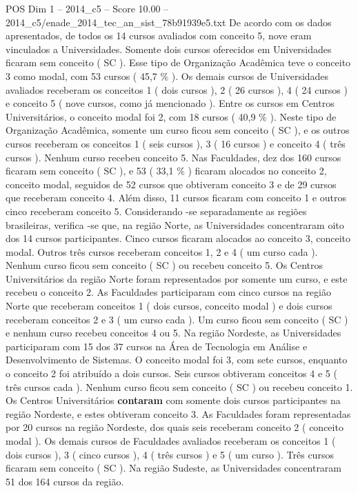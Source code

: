 \begin{textsample}{POS Dim 1 – 2014\_c5 – Score 10.00 – 2014\_c5/enade\_2014\_tec\_an\_sist\_78b91939e5.txt}
De acordo com os dados apresentados, de todos os 14 cursos avaliados com conceito 5, nove eram vinculados a Universidades.
Somente dois cursos oferecidos em Universidades ficaram sem conceito ( SC ).
Esse tipo de Organização Acadêmica teve o conceito 3 como modal, com 53 cursos ( 45,7 \% ).
Os demais cursos de Universidades avaliados receberam os conceitos 1 ( dois cursos ), 2 ( 26 cursos ), 4 ( 24 cursos ) e conceito 5 ( nove cursos, como já mencionado ).
Entre os cursos em Centros Universitários, o conceito modal foi 2, com 18 cursos ( 40,9 \% ).
Neste tipo de Organização Acadêmica, somente um curso ficou sem conceito ( SC ), e os outros cursos receberam os conceitos 1 ( seis cursos ), 3 ( 16 cursos ) e conceito 4 ( três cursos ).
Nenhum curso recebeu conceito 5.
Nas Faculdades, dez dos 160 cursos ficaram sem conceito ( SC ), e 53 ( 33,1 \% ) ficaram alocados no conceito 2, conceito modal, seguidos de 52 cursos que obtiveram conceito 3 e de 29 cursos que receberam conceito 4.
Além disso, 11 cursos ficaram com conceito 1 e outros cinco receberam conceito 5.
Considerando -se separadamente as regiões brasileiras, verifica -se que, na região Norte, as Universidades concentraram oito dos 14 cursos participantes.
Cinco cursos ficaram alocados ao conceito 3, conceito modal.
Outros três cursos receberam conceitos 1, 2 e 4 ( um curso cada ).
Nenhum curso ficou sem conceito ( SC ) ou recebeu conceito 5.
Os Centros Universitários da região Norte foram representados por somente um curso, e este recebeu o conceito 2.
As Faculdades participaram com cinco cursos na região Norte que receberam conceitos 1 ( dois cursos, conceito modal ) e dois cursos receberam conceitos 2 e 3 ( um curso cada ).
Um curso ficou sem conceito ( SC ) e nenhum curso recebeu conceitos 4 ou 5.
Na região Nordeste, as Universidades participaram com 15 dos 37 cursos na Área de Tecnologia em Análise e Desenvolvimento de Sistemas.
O conceito modal foi 3, com sete cursos, enquanto o conceito 2 foi atribuído a dois cursos.
Seis cursos obtiveram conceitos 4 e 5 ( três cursos cada ).
Nenhum curso ficou sem conceito ( SC ) ou recebeu conceito 1.
Os Centros Universitários \textbf{contaram} com somente dois cursos participantes na região Nordeste, e estes obtiveram conceito 3.
As Faculdades foram representadas por 20 cursos na região Nordeste, dos quais seis receberam conceito 2 ( conceito modal ).
Os demais cursos de Faculdades avaliados receberam os conceitos 1 ( dois cursos ), 3 ( cinco cursos ), 4 ( três cursos ) e 5 ( um curso ).
Três cursos ficaram sem conceito ( SC ).
Na região Sudeste, as Universidades concentraram 51 dos 164 cursos da região.

\end{textsample}
